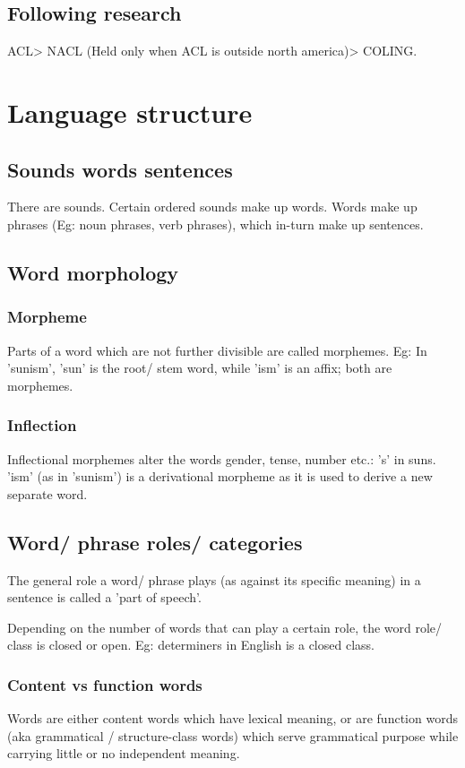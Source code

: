 \documentclass[oneside, article]{memoir}
\begin{document}
\section{Following research}
ACL> NACL (Held only when ACL is outside north america)> COLING.


\chapter{Language structure}
\section{Sounds words sentences}
There are sounds. Certain ordered sounds make up words. Words make up phrases (Eg: noun phrases, verb phrases), which in-turn make up sentences.

\section{Word morphology}
\subsection{Morpheme}
Parts of a word which are not further divisible are called morphemes. Eg: In 'sunism', 'sun' is the root/ stem word, while 'ism' is an affix; both are morphemes.

\subsection{Inflection}
Inflectional morphemes alter the words gender, tense, number etc.: 's' in suns. 'ism' (as in 'sunism') is a derivational morpheme as it is used to derive a new separate word.



\section{Word/ phrase roles/ categories}
The general role a word/ phrase plays (as against its specific meaning) in a sentence is called a 'part of speech'.

Depending on the number of words that can play a certain role, the word role/ class is closed or open. Eg: determiners in English is a closed class.

\subsection{Content vs function words}
Words are either content words which have lexical meaning, or are function words (aka grammatical / structure-class words) which serve grammatical purpose while carrying little or no independent meaning.
\end{document}
